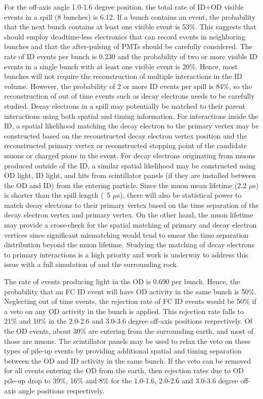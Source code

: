For the off-axis angle 1.0-1.6 degree position, the total rate of ID+OD visible events in a spill (8 bunches) is 6.12.  If a bunch contains 
an event, the probability that the next bunch contains at least one visible event is 53\%.  This suggests that \nuprismlite should employ
deadtime-less electronics that can record events in neighboring bunches and that the after-pulsing of PMTs
should be carefully considered. 
The rate of ID events per bunch is 0.230 and the probability of two or more visible ID
events in a single bunch with at least one visible event is 20\%.  Hence, most bunches will not require the reconstruction of multiple interactions
in the ID volume.  
However, the probability of 2 or more ID events per spill is 84\%, so the reconstruction of out of time events such
as decay electrons needs to be carefully studied.  Decay electrons in a spill may potentially be matched to their parent
 interactions using both spatial and timing information.  For interactions inside the ID, a spatial likelihood matching
 the decay electron to the primary vertex may be constructed based on the reconstructed decay electron vertex position and 
the reconstructed primary vertex or reconstructed stopping point of the candidate muons or charged pions in the event. For decay electrons
 originating from muons produced outside of the ID, a similar spatial likelihood may be constructed using OD light, ID light, and hits from 
scintillator panels (if they are installed between the OD and ID) from the entering particle.   Since the muon mean lifetime (2.2 $\mu$s) is 
shorter than the spill length (~5 $\mu$s), there will also be statistical power to match decay electrons to their primary vertex based on 
the time separation of the decay electron vertex and primary vertex.  On the other hand, the muon lifetime may provide a cross-check for the 
spatial matching of primary and decay electron vertices since significant mismatching would tend to smear the time separation distribution 
beyond the muon lifetime.  Studying the matching of decay electrons to primary interactions is a high priority and work is underway to address 
this issue with a full simulation of \nuprism and the surrounding rock.


The rate of events producing light in the OD is 0.690 per bunch.  Hence, the 
probability that an FC ID event will have OD activity in the same bunch is 50\%.  Neglecting out of time events,
the rejection rate of FC ID events would be 50\% if a veto on any OD activity in the bunch is applied.  This rejection rate falls
to 21\% and 10\% in the 2.0-2.6 and 3.0-3.6 degree off-axis positions respectively.  Of the OD events, about 30\% are entering
from the surrounding earth, and most of those are muons.  The scintillator panels may be used to relax the veto on these types of 
pile-up events by providing additional spatial and timing separation between the OD and ID activity in the same bunch.
If the veto can be removed for all events entering the OD from the earth,
then rejection rates due to OD pile-up drop to 39\%, 16\% and 8\% for the 1.0-1.6, 2.0-2.6 and 3.0-3.6 degree
off-axis angle positions respectively.

